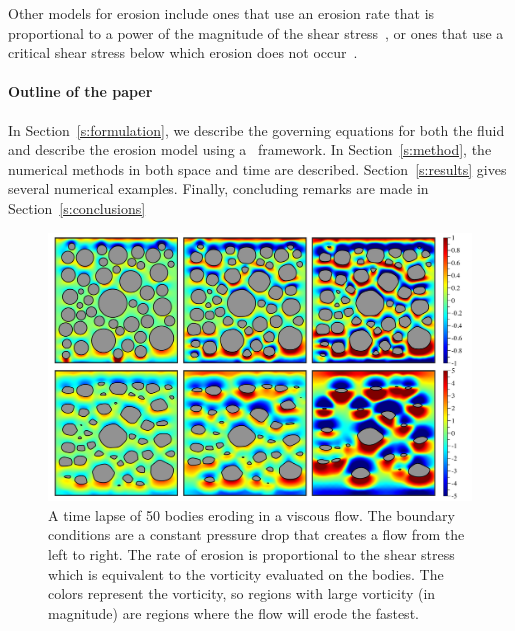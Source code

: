 \documentclass[preprint, 10pt]{elsarticle}
\begin{document}
Other models for erosion include ones that use an erosion rate that is
proportional to a power of the magnitude of the shear
stress~\cite{par-izu2000}, or ones that use a critical shear stress
below which erosion does not occur~\cite{lag2000}.



\paragraph{Outline of the paper} In Section~\ref{s:formulation}, we
describe the governing equations for both the fluid and describe the
erosion model using a \thL~framework.  In Section~\ref{s:method}, the
numerical methods in both space and time are described.
Section~\ref{s:results} gives several numerical examples.  Finally,
concluding remarks are made in Section~\ref{s:conclusions}

\begin{figure}%
\begin{center}
\includegraphics[width = 0.9 \textwidth]{./figs/50bod.pdf}
\caption{\label{fig:50bodies} A time lapse of 50 bodies eroding in a
viscous flow.  The boundary conditions are a constant pressure drop that
creates a flow from the left to right.  The rate of erosion is
proportional to the shear stress which is equivalent to the vorticity
evaluated on the bodies.  The colors represent the vorticity, so regions
with large vorticity (in magnitude) are regions where the flow will
erode the fastest.}
\end{center}
\end{figure}
\end{document}
